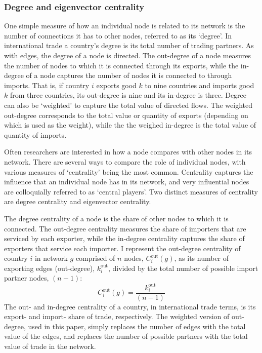 \documentclass[10pt,letterpaper]{article}
\begin{document}
\subsubsection{Degree and eigenvector centrality} \label{nw3}
One simple measure of how an individual node is related to its network is the number of connections it has to other nodes, referred to as its `degree'. In international trade a country's degree is its total number of trading partners. As with edges, the degree of a node is directed. The out-degree of a node measures the number of nodes to which it is connected through its exports, while the in-degree of a node captures the number of nodes it is connected to through imports. That is, if country $i$ exports good $k$ to nine countries and imports good $k$ from three countries, its out-degree is nine and its in-degree is three. Degree can also be `weighted' to capture the total value of directed flows.  The weighted out-degree corresponds to the total value or quantity of exports (depending on which is used as the weight), while the the weighed in-degree is the total value of quantity of imports. 

Often researchers are interested in how a node compares with other nodes in its network. There are several ways to compare the role of individual nodes, with various measures of `centrality' being the most common. Centrality captures the influence that an individual node has in its network, and very influential nodes are colloquially referred to as `central players'. Two distinct measures of centrality are degree centrality and eigenvector centrality. 

The degree centrality of a node is the share of other nodes to which it is connected. The out-degree centrality measures the share of importers that are serviced by each exporter, while the in-degree centrality captures the share of exporters that service each importer. I represent the out-degree centrality of country $i$ in network $g$ comprised of $n$ nodes, $C_i^{\text{out}}(g)$, as its number of exporting edges (out-degree), $k_i^{\text{out}}$, divided by the total number of possible import partner nodes, $(n-1)$:
\begin{equation} 
C_i^{\text{out}}(g) = \frac{k_i^{\text{out}}}{(n-1)}
\end{equation}
The out- and in-degree centrality of a country, in international trade terms, is its export- and import- share of trade, respectively. The weighted version of out-degree, used in this paper, simply replaces the number of edges with the total value of the edges, and replaces the number of possible partners with the total value of trade in the network.
\end{document}
